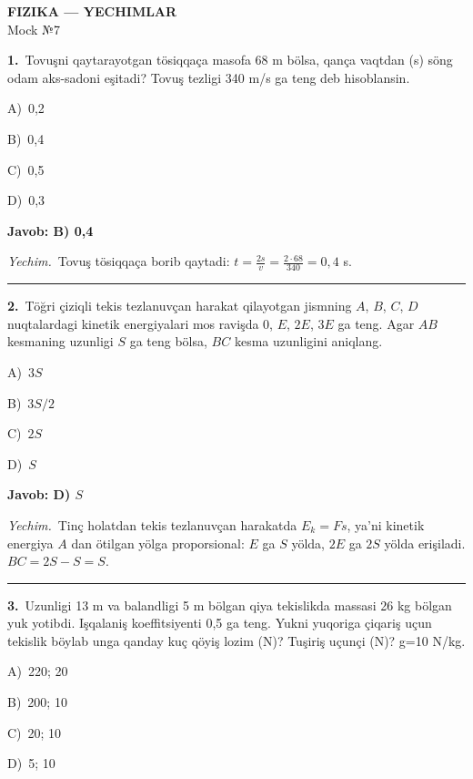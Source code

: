 \documentclass[11pt,a4paper]{article}
\newcommand{\opt}[2]{\hspace*{4mm}#1)\ #2\par}
\begin{document}
\begin{center}{\Large\textbf{FIZIKA — YECHIMLAR}}\\[2pt]{\large Mock №7}\end{center}
\noindent\begin{minipage}{\linewidth}
\textbf{1.}\ Tovuşni qaytarayotgan tösiqqaça masofa 68 m bölsa, qança vaqtdan (s) söng odam aks-sadoni eşitadi? Tovuş tezligi 340 m/s ga teng deb hisoblansin.\par\smallskip
\opt{A}{0,2}
\opt{B}{0,4}
\opt{C}{0,5}
\opt{D}{0,3}
\end{minipage}\vspace{2pt}\par
\noindent\colorbox{gray!12}{\parbox{\dimexpr\linewidth-2\fboxsep}{\textbf{Javob: B) 0,4}}}\par\smallskip
\noindent\textit{Yechim.}\ Tovuş tösiqqaça borib qaytadi: $t=\frac{2s}{v}=\frac{2\cdot68}{340}=0{,}4$ s.\par\par\medskip\hrule\medskip
{}\noindent\begin{minipage}{\linewidth}
\textbf{2.}\ Töğri çiziqli tekis tezlanuvçan harakat qilayotgan jismning $A$, $B$, $C$, $D$ nuqtalardagi kinetik energiyalari mos ravişda 0, $E$, $2E$, $3E$ ga teng. Agar $AB$ kesmaning uzunligi $S$ ga teng bölsa, $BC$ kesma uzunligini aniqlang.\par\smallskip
\opt{A}{$3S$}
\opt{B}{$3S/2$}
\opt{C}{$2S$}
\opt{D}{$S$}
\end{minipage}\vspace{2pt}\par
\noindent\colorbox{gray!12}{\parbox{\dimexpr\linewidth-2\fboxsep}{\textbf{Javob: D) $S$}}}\par\smallskip
\noindent\textit{Yechim.}\ Tinç holatdan tekis tezlanuvçan harakatda $E_k=Fs$, ya’ni kinetik energiya $A$ dan ötilgan yölga proporsional: $E$ ga $S$ yölda, $2E$ ga $2S$ yölda erişiladi. $BC=2S-S=S$.\par\par\medskip\hrule\medskip
{}\noindent\begin{minipage}{\linewidth}
\textbf{3.}\ Uzunligi 13 m va balandligi 5 m bölgan qiya tekislikda massasi 26 kg bölgan yuk yotibdi. Işqalaniş koeffitsiyenti 0,5 ga teng. Yukni yuqoriga çiqariş uçun tekislik böylab unga qanday kuç qöyiş lozim (N)? Tuşiriş uçunçi (N)? g=10 N/kg.\par\smallskip
\opt{A}{220; 20}
\opt{B}{200; 10}
\opt{C}{20; 10}
\opt{D}{5; 10}
\end{minipage}\vspace{2pt}\par
\end{document}

